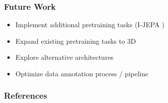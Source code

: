 \documentclass{beamer}
\begin{document}
\begin{frame}
   \frametitle{Future Work}
   \begin{itemize}
        \item Implement additional pretraining tasks (I-JEPA \cite{assran2023selfsupervised})
        \item Expand existing pretraining tasks to 3D
        \item Explore alternative architectures
        \item Optimize data annotation process / pipeline
   \end{itemize}
\end{frame}

\begin{frame}[shrink=20]
   \frametitle{References}
   \printbibliography
\end{frame}
\end{document}

